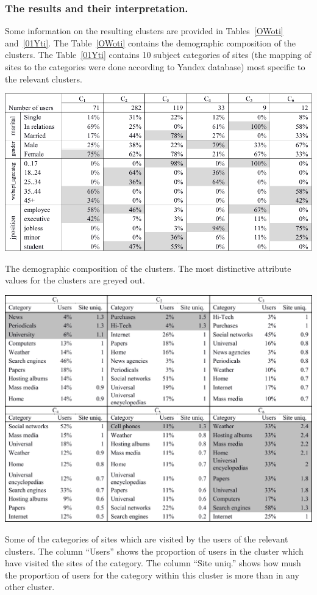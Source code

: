 \documentclass[runningheads,a4paper]{llncs}
\begin{document}
\subsubsection{The results and their interpretation.}

Some information on the resulting clusters are provided in Tables~\ref{OWoti} and~\ref{01Yti}. The Table~\ref{OWoti} contains the demographic composition of the clusters. The Table~\ref{01Yti} contains 10 subject categories of sites (the mapping of sites to the categories were done according to Yandex database) most specific to the relevant clusters.


\begin{table}
	\includegraphics[width=\linewidth]{t1.pdf}
	
	\caption{The demographic composition of the clusters. The most distinctive attribute values for the clusters are greyed out.}
	\label{OWoti}
\end{table}



\begin{table}
	\includegraphics[width=\linewidth]{t2.pdf}
	
	\caption{Some of the categories of sites which are visited by the users of the relevant clusters. The column ``Users'' shows the proportion of users in the cluster which have visited the sites of the category. The column ``Site uniq.'' shows how mush the proportion of users for the category within this cluster is more than in any other cluster. }
	\label{01Yti}
\end{table}
\end{document}
